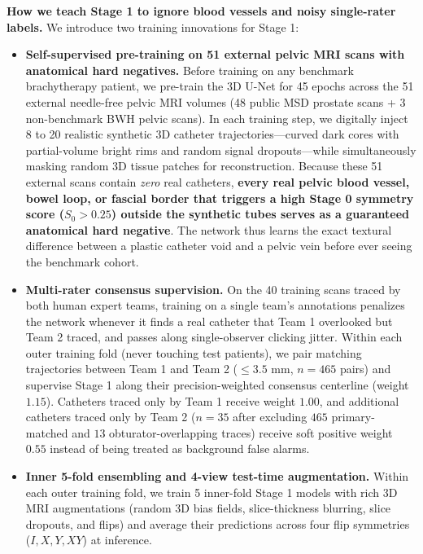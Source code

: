 \documentclass[
  11pt,
]{article}
\providecommand{\tightlist}{%
  \setlength{\itemsep}{0pt}\setlength{\parskip}{0pt}}
\begin{document}
\textbf{How we teach Stage 1 to ignore blood vessels and noisy
single-rater labels.} We introduce two training innovations for Stage 1:

\begin{itemize}
\tightlist
\item
  \textbf{Self-supervised pre-training on 51 external pelvic MRI scans
  with anatomical hard negatives.} Before training on any benchmark
  brachytherapy patient, we pre-train the 3D U-Net for 45 epochs across
  the 51 external needle-free pelvic MRI volumes (48 public MSD prostate
  scans + 3 non-benchmark BWH pelvic scans). In each training step, we
  digitally inject 8 to 20 realistic synthetic 3D catheter
  trajectories---curved dark cores with partial-volume bright rims and
  random signal dropouts---while simultaneously masking random 3D tissue
  patches for reconstruction. Because these 51 external scans contain
  \emph{zero} real catheters, \textbf{every real pelvic blood vessel,
  bowel loop, or fascial border that triggers a high Stage 0 symmetry
  score (\(S_0 > 0.25\)) outside the synthetic tubes serves as a
  guaranteed anatomical hard negative}. The network thus learns the
  exact textural difference between a plastic catheter void and a pelvic
  vein before ever seeing the benchmark cohort.
\item
  \textbf{Multi-rater consensus supervision.} On the 40 training scans
  traced by both human expert teams, training on a single team's
  annotations penalizes the network whenever it finds a real catheter
  that Team 1 overlooked but Team 2 traced, and passes along
  single-observer clicking jitter. Within each outer training fold
  (never touching test patients), we pair matching trajectories between
  Team 1 and Team 2 (\(\le 3.5\text{ mm}\), \(n = 465\) pairs) and
  supervise Stage 1 along their precision-weighted consensus centerline
  (weight \(1.15\)). Catheters traced only by Team 1 receive weight
  \(1.00\), and additional catheters traced only by Team 2 (\(n = 35\)
  after excluding \(465\) primary-matched and \(13\)
  obturator-overlapping traces) receive soft positive weight \(0.55\)
  instead of being treated as background false alarms.
\item
  \textbf{Inner 5-fold ensembling and 4-view test-time augmentation.}
  Within each outer training fold, we train 5 inner-fold Stage 1 models
  with rich 3D MRI augmentations (random 3D bias fields, slice-thickness
  blurring, slice dropouts, and flips) and average their predictions
  across four flip symmetries (\(I, X, Y, XY\)) at inference.
\end{itemize}
\end{document}
